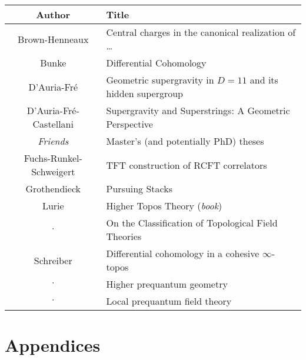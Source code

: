 \documentclass[11pt, a4paper]{report}
\begin{document}
    \begin{center}
        \begin{tabular}{|c|l|}
            \hline
            Author&Title\\
            \hline
            Brown-Henneaux&Central charges in the canonical realization of \ldots\\
			Bunke&Differential Cohomology\\
			D'Auria-Fr\'e&Geometric supergravity in $D=11$ and its hidden supergroup\\
			D'Auria-Fr\'e-Castellani&Supergravity and Superstrings: A Geometric Perspective\\
            \textit{Friends}&Master's (and potentially PhD) theses\\
            Fuchs-Runkel-Schweigert&TFT construction of RCFT correlators\\
            Grothendieck&Pursuing Stacks\\
            Lurie&Higher Topos Theory (\textit{book})\\
            $\cdot$&On the Classification of Topological Field Theories\\
            Schreiber&Differential cohomology in a cohesive $\infty$-topos\\
            $\cdot$&Higher prequantum geometry\\
            $\cdot$&Local prequantum field theory\\
            \hline
        \end{tabular}
    \end{center}

\part{Appendices}
\begin{appendices}





\end{appendices}

\nomenclature[S_zsyminto]{$]a,b[$}{open interval}

\printnomenclature

\nocite{*}



\printindex
\end{document}
